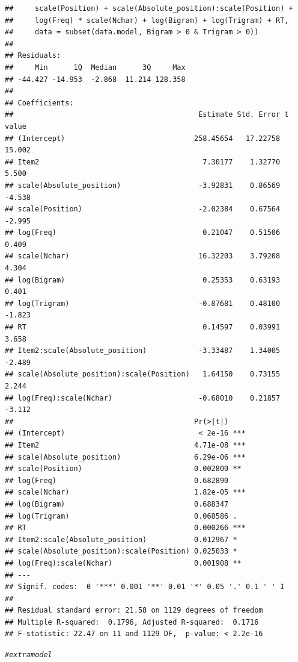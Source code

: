 \documentclass{article}\usepackage[]{graphicx}\usepackage[]{color}
\makeatletter
\newcommand{\hlcom}[1]{\textcolor[rgb]{0.678,0.584,0.686}{\textit{#1}}}%
\newenvironment{kframe}{%
 \def\at@end@of@kframe{}%
 \ifinner\ifhmode%
  \def\at@end@of@kframe{\end{minipage}}%
  \begin{minipage}{\columnwidth}%
 \fi\fi%
 \def\FrameCommand##1{\hskip\@totalleftmargin \hskip-\fboxsep
 \colorbox{shadecolor}{##1}\hskip-\fboxsep
     \hskip-\linewidth \hskip-\@totalleftmargin \hskip\columnwidth}%
 \MakeFramed {\advance\hsize-\width
   \@totalleftmargin\z@ \linewidth\hsize
   \@setminipage}}%
 {\par\unskip\endMakeFramed%
 \at@end@of@kframe}
\newenvironment{knitrout}{}{} %
\makeatother
\begin{document}
\begin{knitrout}
\begin{kframe}
\begin{verbatim}
##     scale(Position) + scale(Absolute_position):scale(Position) + 
##     log(Freq) * scale(Nchar) + log(Bigram) + log(Trigram) + RT, 
##     data = subset(data.model, Bigram > 0 & Trigram > 0))
## 
## Residuals:
##     Min      1Q  Median      3Q     Max 
## -44.427 -14.953  -2.868  11.214 128.358 
## 
## Coefficients:
##                                           Estimate Std. Error t value
## (Intercept)                              258.45654   17.22758  15.002
## Item2                                      7.30177    1.32770   5.500
## scale(Absolute_position)                  -3.92831    0.86569  -4.538
## scale(Position)                           -2.02384    0.67564  -2.995
## log(Freq)                                  0.21047    0.51506   0.409
## scale(Nchar)                              16.32203    3.79208   4.304
## log(Bigram)                                0.25353    0.63193   0.401
## log(Trigram)                              -0.87681    0.48100  -1.823
## RT                                         0.14597    0.03991   3.658
## Item2:scale(Absolute_position)            -3.33487    1.34005  -2.489
## scale(Absolute_position):scale(Position)   1.64150    0.73155   2.244
## log(Freq):scale(Nchar)                    -0.68010    0.21857  -3.112
##                                          Pr(>|t|)    
## (Intercept)                               < 2e-16 ***
## Item2                                    4.71e-08 ***
## scale(Absolute_position)                 6.29e-06 ***
## scale(Position)                          0.002800 ** 
## log(Freq)                                0.682890    
## scale(Nchar)                             1.82e-05 ***
## log(Bigram)                              0.688347    
## log(Trigram)                             0.068586 .  
## RT                                       0.000266 ***
## Item2:scale(Absolute_position)           0.012967 *  
## scale(Absolute_position):scale(Position) 0.025033 *  
## log(Freq):scale(Nchar)                   0.001908 ** 
## ---
## Signif. codes:  0 '***' 0.001 '**' 0.01 '*' 0.05 '.' 0.1 ' ' 1
## 
## Residual standard error: 21.58 on 1129 degrees of freedom
## Multiple R-squared:  0.1796,	Adjusted R-squared:  0.1716 
## F-statistic: 22.47 on 11 and 1129 DF,  p-value: < 2.2e-16
\end{verbatim}
\begin{alltt}
\hlcom{# extra model}


\end{alltt}
\end{kframe}
\end{knitrout}
\end{document}
